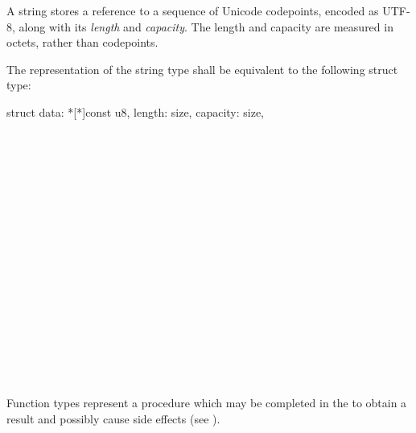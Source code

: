 \specsubsubitem
A string stores a reference to a sequence of Unicode codepoints, encoded as
UTF-8, along with its \textit{length} and \textit{capacity}. The length and
capacity are measured in octets, rather than codepoints.

\specsubsubitem
The representation of the string type shall be equivalent to the following
struct type:

\begin{codesample}
struct {
	data: *[*]const u8,
	length: size,
	capacity: size,
}
\end{codesample}


\begin{grammar}
 \\
	   \\

 \\
	\terminal{(}  \terminal{)}  \\

 \\
	 \\

 \\
	 \optional{\terminal{,}} \\
	  \optional{\terminal{,}} \\
	 \terminal{,}  \optional{\terminal{,}} \\

 \\
	 \\
	 \terminal{,}  \\

 \\
	 \terminal{:}  \\
	\terminal{\_} \terminal{:}  \\
\end{grammar}

\specsubsubitem
Function types represent a procedure which may be completed in the
 to obtain a result and possibly cause side
effects (see ).

